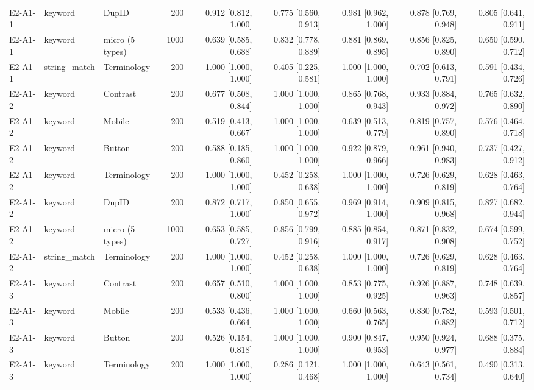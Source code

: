 \begin{table}[t]
\begin{tabular}{lllrrrrrr}
E2-A1-1 & keyword & DupID & 200 & 0.912 [0.812, 1.000] & 0.775 [0.560, 0.913] & 0.981 [0.962, 1.000] & 0.878 [0.769, 0.948] & 0.805 [0.641, 0.911] \\
E2-A1-1 & keyword & micro (5 types) & 1000 & 0.639 [0.585, 0.688] & 0.832 [0.778, 0.889] & 0.881 [0.869, 0.895] & 0.856 [0.825, 0.890] & 0.650 [0.590, 0.712] \\
E2-A1-1 & string\_match & Terminology & 200 & 1.000 [1.000, 1.000] & 0.405 [0.225, 0.581] & 1.000 [1.000, 1.000] & 0.702 [0.613, 0.791] & 0.591 [0.434, 0.726] \\
E2-A1-2 & keyword & Contrast & 200 & 0.677 [0.508, 0.844] & 1.000 [1.000, 1.000] & 0.865 [0.768, 0.943] & 0.933 [0.884, 0.972] & 0.765 [0.632, 0.890] \\
E2-A1-2 & keyword & Mobile & 200 & 0.519 [0.413, 0.667] & 1.000 [1.000, 1.000] & 0.639 [0.513, 0.779] & 0.819 [0.757, 0.890] & 0.576 [0.464, 0.718] \\
E2-A1-2 & keyword & Button & 200 & 0.588 [0.185, 0.860] & 1.000 [1.000, 1.000] & 0.922 [0.879, 0.966] & 0.961 [0.940, 0.983] & 0.737 [0.427, 0.912] \\
E2-A1-2 & keyword & Terminology & 200 & 1.000 [1.000, 1.000] & 0.452 [0.258, 0.638] & 1.000 [1.000, 1.000] & 0.726 [0.629, 0.819] & 0.628 [0.463, 0.764] \\
E2-A1-2 & keyword & DupID & 200 & 0.872 [0.717, 1.000] & 0.850 [0.655, 0.972] & 0.969 [0.914, 1.000] & 0.909 [0.815, 0.968] & 0.827 [0.682, 0.944] \\
E2-A1-2 & keyword & micro (5 types) & 1000 & 0.653 [0.585, 0.727] & 0.856 [0.799, 0.916] & 0.885 [0.854, 0.917] & 0.871 [0.832, 0.908] & 0.674 [0.599, 0.752] \\
E2-A1-2 & string\_match & Terminology & 200 & 1.000 [1.000, 1.000] & 0.452 [0.258, 0.638] & 1.000 [1.000, 1.000] & 0.726 [0.629, 0.819] & 0.628 [0.463, 0.764] \\
E2-A1-3 & keyword & Contrast & 200 & 0.657 [0.510, 0.800] & 1.000 [1.000, 1.000] & 0.853 [0.775, 0.925] & 0.926 [0.887, 0.963] & 0.748 [0.639, 0.857] \\
E2-A1-3 & keyword & Mobile & 200 & 0.533 [0.436, 0.664] & 1.000 [1.000, 1.000] & 0.660 [0.563, 0.765] & 0.830 [0.782, 0.882] & 0.593 [0.501, 0.712] \\
E2-A1-3 & keyword & Button & 200 & 0.526 [0.154, 0.818] & 1.000 [1.000, 1.000] & 0.900 [0.847, 0.953] & 0.950 [0.924, 0.977] & 0.688 [0.375, 0.884] \\
E2-A1-3 & keyword & Terminology & 200 & 1.000 [1.000, 1.000] & 0.286 [0.121, 0.468] & 1.000 [1.000, 1.000] & 0.643 [0.561, 0.734] & 0.490 [0.313, 0.640] \\

\end{tabular}
\end{table}
